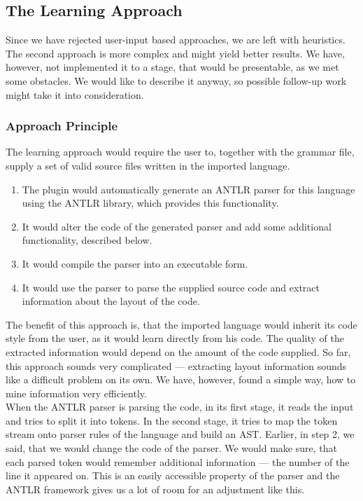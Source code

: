 \subsection{The Learning Approach}
\label{chap:learning_approach}

Since we have rejected user-input based approaches, we are left with heuristics.
The second approach is more complex and might yield better results.
We have, however, not implemented it to a stage, that would be presentable, as we met some obstacles.
We would like to describe it anyway, so possible follow-up work might take it into consideration.
\\

\subsubsection{Approach Principle}

The learning approach would require the user to, together with the grammar file, supply a set of valid source files written in the imported language.

\begin{enumerate}
	\item The plugin would automatically generate an ANTLR parser for this language using the ANTLR library, which provides this functionality.
	
	\item It would alter the code of the generated parser and add some additional functionality, described below.
	
	\item It would compile the parser into an executable form.
	
	\item It would use the parser to parse the supplied source code and extract information about the layout of the code.
\end{enumerate}

The benefit of this approach is, that the imported language would inherit its code style from the user, as it would learn directly from his code.
The quality of the extracted information would depend on the amount of the code supplied.
So far, this approach sounds very complicated --- extracting layout information sounds like a difficult problem on its own.
We have, however, found a simple way, how to mine information very efficiently.
\\

When the ANTLR parser is parsing the code, in its first stage, it reads the input and tries to split it into tokens.
In the second stage, it tries to map the token stream onto parser rules of the language and build an AST.
Earlier, in step 2, we said, that we would change the code of the parser.
We would make sure, that each parsed token would remember additional information --- the number of the line it appeared on.
This is an easily accessible property of the parser and the ANTLR framework gives us a lot of room for an adjustment like this.
\\

